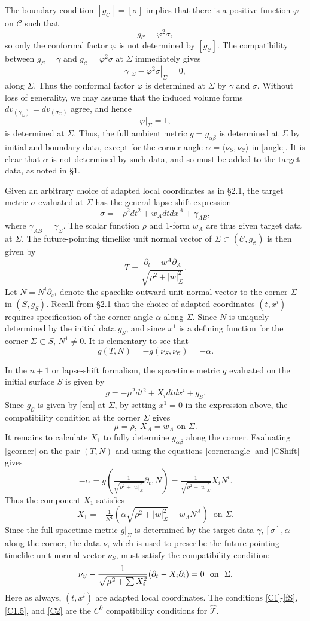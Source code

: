 \documentclass[10pt]{amsart}
\renewcommand{\a}{\alpha}
\renewcommand{\b}{\beta}
\newcommand{\g}{\gamma}
\newcommand{\f}{\varphi}
\newcommand{\s}{\sigma}
\newcommand{\Si}{\Sigma}
\newcommand{\cC}{{\mathcal C}}
\newcommand{\cT}{{\mathcal T}}
\newcommand{\be}{\begin{equation}}
\newcommand{\ee}{\end{equation}}
\newcommand{\bes}{\begin{equation*}}
\newcommand{\ees}{\end{equation*}}
\newcommand{\p}{\partial}
\renewcommand{\hat}{\widehat}
\newcommand{\<}{\langle}
\renewcommand{\>}{\rangle}
\theoremstyle{plain}
\theoremstyle{remark}
\theoremstyle{definition}
\numberwithin{equation}{section}
\begin{document}
  The boundary condition $[g_{\cC}] = [\s]$ implies that there is a positive function $\f$  on $\cC$ such that 
\be \label{fconf}
g_{\cC} = \f^2 \s,
\ee
so only the conformal factor $\f$ is not determined by $[g_{\cC}]$. The compatibility between $g_S = \g$ and $g_{\cC} = \f^2 \s$ at $\Si$ 
immediately gives 
\be \label{C1}
\g |_{\Si} - \f^2 \s |_{\Si} = 0 ,
\ee
along $\Si$. Thus the conformal factor $\f$ is determined at $\Si$ by $\g$ and $\s$. Without loss of generality, we may assume that the induced 
volume forms $dv_{(\g_\Si)} = dv_{(\s_\Si)}$ agree, and hence 
\be \label{fS}
\f |_{\Si} = 1,
\ee
is determined at $\Si$. Thus, the full ambient metric $g = g_{\a\b}$ is determined at $\Si$ by initial and boundary data, except for the corner 
angle $\a = \<\nu_S, \nu_{\cC}\>$ in \eqref{angle}. It is clear that $\a$ is not determined by such data, and so must be added to the target data, as 
noted in \S 1. 

   Given an arbitrary choice of adapted local coordinates as in \S 2.1, the target metric $\s$ evaluated at $\Si$ has the 
general lapse-shift expression
\be \label{cm}
\s=-\rho^2 dt^2+w_Adtdx^A+\g_{AB},
\ee 
where $\g_{AB} = \g_{\Si}$. The scalar function $\rho$ and 1-form $w_A$ are thus given target data at $\Si$. The future-pointing  timelike unit 
normal vector of $\Sigma\subset (\cC,g_\cC)$ is then 
given by
\be \label{CShift}
T = \frac{\p_t-w^A\p_A}{\sqrt{\rho^2+|w|_\Si^2}}.
\ee
 Let $N=N^i\p_{x^i}$ denote the spacelike outward unit normal vector to the corner $\Si$ in $(S,g_S)$. Recall from \S 2.1 that the choice of 
 adapted coordinates $(t, x^i)$ requires specification of the corner angle $\a$ along $\Si$. Since $N$ is uniquely determined by the initial data 
 $g_S$, and since $x^1$ is a defining function for the corner $\Si \subset S$, $N^1\neq 0$. It is elementary to see that 
\be\label{cornerangle}
g(T,N) = - g(\nu_S, \nu_{\cC}) = -\a.
\ee

   In the $n+1$ or lapse-shift formalism, the spacetime metric $g$ evaluated on the initial surface $S$ is given by
\be\label{gcorner}
g=-\mu^2dt^2+X_idtdx^i+g_S.
\ee
Since $g_\cC$ is given by \eqref{cm} at $\Si$, by setting $x^1=0$ in the expression above, the compatibility condition at the corner 
$\Si$ gives 
\be \label{C1.5}
\mu=\rho,\ X_A=w_A \mbox{ on }\Si.
\ee 
It remains to calculate $X_1$ to fully determine $g_{\a\b}$ along the corner. Evaluating \eqref{gcorner} on the pair $(T, N)$ and using 
the equations \eqref{cornerangle} and \eqref{CShift} gives  
\bes
-\a=g(\tfrac{1}{\sqrt{\rho^2+|w|^2_\Si}}\p_t,N)
=\tfrac{1}{\sqrt{\rho^2+|w|^2_\Si}}X_i N^i.
\ees
Thus the component $X_1$ satisfies 
\bes
X_1=-\tfrac{1}{N^1}(\a\sqrt{\rho^2+|w|^2_\Si}+w_AN^A) \ \mbox{ on }\Si.
\ees
Since the full spacetime metric $g|_{\Si}$ is determined by the target data $\g, [\s], \a$ along the corner, the data $\nu$, which is used to prescribe 
the future-pointing timelike unit normal vector $\nu_S$, must satisfy the compatibility condition:
\be \label{C2}
\nu_S - \frac{1}{\sqrt{\mu^2 + \sum X_i^2}}(\p_t - X_i \p_i) = 0 \ \ {\rm on} \ \ \Si.
\ee
Here as always, $(t, x^i)$ are adapted local coordinates. The conditions  \eqref{C1}-\eqref{fS}, \eqref{C1.5}, and \eqref{C2} are the $C^0$ compatibility 
conditions for $\hat \cT$. 
\end{document}
